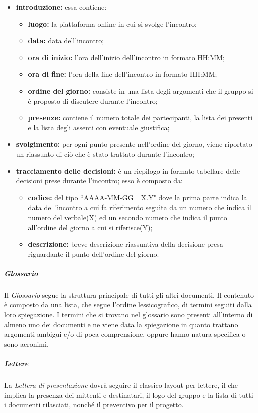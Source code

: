 				\begin{itemize}
						\item \textbf{introduzione:} essa contiene:
							\begin{itemize}
								\item \textbf{luogo:} la piattaforma online in cui si svolge l'incontro;
								\item \textbf{data:} data dell'incontro;
								\item \textbf{ora di inizio:} l'ora dell'inizio dell'incontro in formato HH:MM;
								\item \textbf{ora di fine:} l'ora della fine dell'incontro in formato HH:MM;
								\item \textbf{ordine del giorno:} consiste in una lista degli argomenti che il gruppo si è proposto di discutere durante l'incontro;
								\item \textbf{presenze:} contiene il numero totale dei partecipanti, la lista dei presenti e la lista degli assenti con eventuale giustifica;
							\end{itemize}
							\item \textbf{svolgimento:} per ogni punto presente nell'ordine del giorno, viene riportato un riassunto di ciò che è stato trattato durante l'incontro;
							\item \textbf{tracciamento delle decisioni:} è un riepilogo in formato tabellare delle decisioni prese durante l'incontro; esso è composto da:
							\begin{itemize}
								\item \textbf{codice:} del tipo ``AAAA-MM-GG\_ X.Y" dove la prima parte indica la data dell'incontro a cui fa riferimento seguita da un numero che indica il numero del verbale(X) ed un secondo numero che indica il punto all'ordine del giorno a cui si riferisce(Y);
								\item{ \textbf{descrizione:} breve descrizione riassuntiva della decisione presa riguardante il punto dell'ordine del giorno.}
								\end{itemize}
					\end{itemize}
				\subparagraph{Glossario}
				Il \textit{Glossario} segue la struttura principale di tutti gli altri documenti. Il contenuto è composto da una lista, che segue l'ordine lessicografico, di termini seguiti dalla loro spiegazione. I termini che si trovano nel glossario sono presenti all'interno di almeno uno dei documenti e ne viene data la spiegazione in quanto trattano argomenti ambigui e/o di poca comprensione, oppure hanno natura specifica o sono acronimi. 
				\subparagraph{Lettere}
				La \textit{Lettera di presentazione} dovrà seguire il classico layout per lettere, il che implica la presenza dei mittenti e destinatari, il logo del gruppo e la lista di tutti i documenti rilasciati, nonché il preventivo per il progetto.
